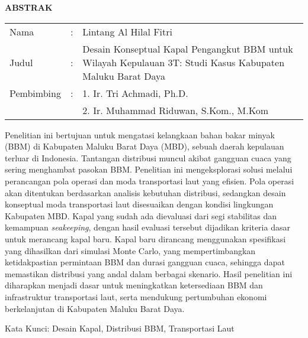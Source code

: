 \begin{center}
  \large\textbf{ABSTRAK}
\end{center}

\vspace{2ex}

\begingroup
  \setlength{\tabcolsep}{0pt}
  \noindent
  \begin{tabularx}{\textwidth}{l >{\centering}m{2em} X}
    Nama        &:& Lintang Al Hilal Fitri \\
    Judul       &:&	Desain Konseptual Kapal Pengangkut BBM untuk Wilayah Kepulauan 3T: Studi Kasus Kabupaten Maluku Barat Daya \\
    Pembimbing  &:& 1. Ir. Tri Achmadi, Ph.D.  \\
                & & 2. Ir. Muhammad Riduwan, S.Kom., M.Kom \\
  \end{tabularx}
\endgroup

Penelitian ini bertujuan untuk mengatasi kelangkaan bahan bakar minyak (BBM) di Kabupaten Maluku Barat Daya (MBD), sebuah daerah kepulauan terluar di Indonesia. Tantangan distribusi muncul akibat gangguan cuaca yang sering menghambat pasokan BBM. Penelitian ini mengeksplorasi solusi melalui perancangan pola operasi dan moda transportasi laut yang efisien. Pola operasi akan ditentukan berdasarkan analisis kebutuhan distribusi, sedangkan desain konseptual moda transportasi laut disesuaikan dengan kondisi lingkungan Kabupaten MBD. Kapal yang sudah ada dievaluasi dari segi stabilitas dan kemampuan \emph{seakeeping}, dengan hasil evaluasi tersebut dijadikan kriteria dasar untuk merancang kapal baru. Kapal baru dirancang menggunakan spesifikasi yang dihasilkan dari simulasi Monte Carlo, yang mempertimbangkan ketidakpastian permintaan BBM dan durasi gangguan cuaca, sehingga dapat memastikan distribusi yang andal dalam berbagai skenario. Hasil penelitian ini diharapkan menjadi dasar untuk meningkatkan ketersediaan BBM dan infrastruktur transportasi laut, serta mendukung pertumbuhan ekonomi berkelanjutan di Kabupaten Maluku Barat Daya.

Kata Kunci: Desain Kapal, Distribusi BBM, Transportasi Laut
